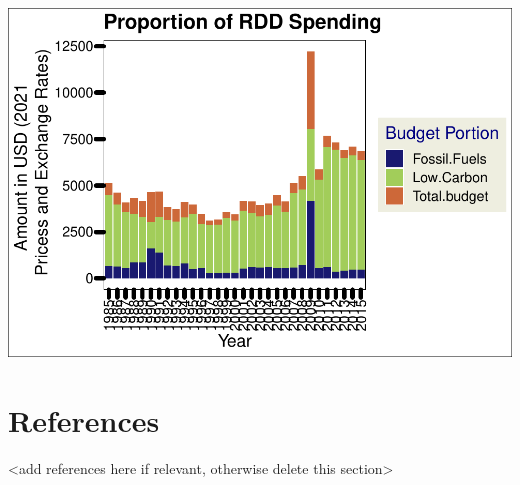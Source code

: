 \documentclass[
  12pt,
]{article}
\begin{document}
\includegraphics{Chang_Jenkins_Mullens_ENV872_Final_files/figure-latex/Combined bar plot of US RDD-1.pdf}

\hypertarget{references}{%
\section{References}\label{references}}

\textless add references here if relevant, otherwise delete this
section\textgreater{}
\end{document}

